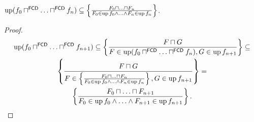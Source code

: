 \begin{cor}
$\operatorname{up} (f_0 \sqcap^{\mathsf{FCD}} \ldots
\sqcap^{\mathsf{FCD}} f_n) \subseteq \left\{ \frac{ F_0 \sqcap \ldots \sqcap
F_n }{ F_0 \in \operatorname{up} f_0 \wedge \ldots \wedge F_n \in \operatorname{up} f_n }\right\}$.
\end{cor}

\begin{proof}
~
\begin{multline*}
\operatorname{up} (f_0 \sqcap^{\mathsf{FCD}} \ldots
\sqcap^{\mathsf{FCD}} f_{n + 1}) \subseteq \left\{ \frac{ F \sqcap G
}{ F \in \operatorname{up} (f_0 \sqcap^{\mathsf{FCD}}
\ldots \sqcap^{\mathsf{FCD}} f_n), G \in \operatorname{up} f_{n + 1} }\right\} \subseteq \\
\left\{ \frac{ F \sqcap G }{ F \in \left\{ \frac{ F_0
\sqcap \ldots \sqcap F_n }{ F_0 \in \operatorname{up} f_0
\wedge \ldots \wedge F_n \in \operatorname{up} f_n }\right\}, G \in \operatorname{up} f_{n + 1} }\right\} = \\
\left\{ \frac{ F_0 \sqcap \ldots \sqcap F_{n + 1} }{
F_0 \in \operatorname{up} f_0 \wedge \ldots \wedge F_{n + 1} \in
\operatorname{up} f_{n + 1} }\right\}.
\end{multline*}
\end{proof}
